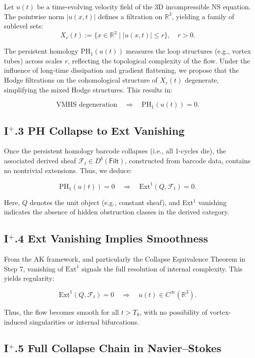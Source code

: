 \documentclass[11pt]{article}
\begin{document}
Let \( u(t) \) be a time-evolving velocity field of the 3D incompressible NS equation.  
The pointwise norm \( |u(x,t)| \) defines a filtration on \( \mathbb{R}^3 \),  
yielding a family of sublevel sets:
\[
X_r(t) := \{ x \in \mathbb{R}^3 \mid |u(x,t)| \leq r \}, \quad r > 0.
\]

The persistent homology \( \mathrm{PH}_1(u(t)) \) measures the loop structures (e.g., vortex tubes)  
across scales \( r \), reflecting the topological complexity of the flow.  
Under the influence of long-time dissipation and gradient flattening,  
we propose that the Hodge filtrations on the cohomological structure  
of \( X_r(t) \) degenerate, simplifying the mixed Hodge structures.  
This results in:

\[
\text{VMHS degeneration} \quad \Rightarrow \quad \mathrm{PH}_1(u(t)) = 0.
\]

\subsection*{I$^+$.3 PH Collapse to Ext Vanishing}

Once the persistent homology barcode collapses (i.e., all 1-cycles die),  
the associated derived sheaf \( \mathcal{F}_t \in D^b(\mathsf{Filt}) \),  
constructed from barcode data, contains no nontrivial extensions.  
Thus, we deduce:

\[
\mathrm{PH}_1(u(t)) = 0 \quad \Rightarrow \quad \mathrm{Ext}^1(Q, \mathcal{F}_t) = 0.
\]

Here, \( Q \) denotes the unit object (e.g., constant sheaf), and Ext$^1$ vanishing indicates  
the absence of hidden obstruction classes in the derived category.

\subsection*{I$^+$.4 Ext Vanishing Implies Smoothness}

From the AK framework, and particularly the Collapse Equivalence Theorem in Step 7,  
vanishing of \( \mathrm{Ext}^1 \) signals the full resolution of internal complexity.  
This yields regularity:

\[
\mathrm{Ext}^1(Q, \mathcal{F}_t) = 0 \quad \Rightarrow \quad u(t) \in C^\infty(\mathbb{R}^3).
\]

Thus, the flow becomes smooth for all \( t > T_0 \), with no possibility  
of vortex-induced singularities or internal bifurcations.

\subsection*{I$^+$.5 Full Collapse Chain in Navier--Stokes}
\end{document}

